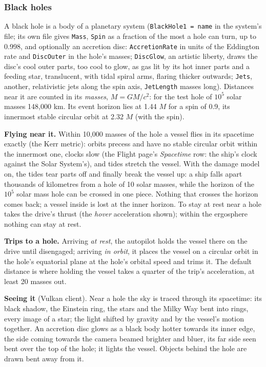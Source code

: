 \documentclass[Orbiter User Manual.tex]{subfiles}
\begin{document}
\subsubsection{Black holes}
A black hole is a body of a planetary system (\texttt{BlackHole1 = name} in the system's file; its own file gives \texttt{Mass}, \texttt{Spin} as a fraction of the most a hole can turn, up to 0.998, and optionally an accretion disc: \texttt{AccretionRate} in units of the Eddington rate and \texttt{DiscOuter} in the hole's masses; \texttt{DiscGlow}, an artistic liberty, draws the disc's cool outer parts, too cool to glow, as gas lit by its hot inner parts and a feeding star, translucent, with tidal spiral arms, flaring thicker outwards; \texttt{Jets}, another, relativistic jets along the spin axis, \texttt{JetLength} masses long). Distances near it are counted in its \textit{masses}, $M = GM/c^2$: for the test hole of $10^5$ solar masses 148,000 km. Its event horizon lies at 1.44 $M$ for a spin of 0.9, its innermost stable circular orbit at 2.32 $M$ (with the spin).

\textbf{Flying near it.} Within 10,000 masses of the hole a vessel flies in its spacetime exactly (the Kerr metric): orbits precess and have no stable circular orbit within the innermost one, clocks slow (the Flight page's \textit{Spacetime} row: the ship's clock against the Solar System's), and tides stretch the vessel. With the damage model on, the tides tear parts off and finally break the vessel up: a ship falls apart thousands of kilometres from a hole of 10 solar masses, while the horizon of the $10^5$ solar mass hole can be crossed in one piece. Nothing that crosses the horizon comes back; a vessel inside is lost at the inner horizon. To stay at rest near a hole takes the drive's thrust (the \textit{hover} acceleration shown); within the ergosphere nothing can stay at rest.

\textbf{Trips to a hole.} Arriving \textit{at rest}, the autopilot holds the vessel there on the drive until disengaged; arriving \textit{in orbit}, it places the vessel on a circular orbit in the hole's equatorial plane at the hole's orbital speed and trims it. The default distance is where holding the vessel takes a quarter of the trip's acceleration, at least 20 masses out.

\textbf{Seeing it} (Vulkan client). Near a hole the sky is traced through its spacetime: its black shadow, the Einstein ring, the stars and the Milky Way bent into rings, every image of a star; the light shifted by gravity and by the vessel's motion together. An accretion disc glows as a black body hotter towards its inner edge, the side coming towards the camera beamed brighter and bluer, its far side seen bent over the top of the hole; it lights the vessel. Objects behind the hole are drawn bent away from it.
\end{document}
